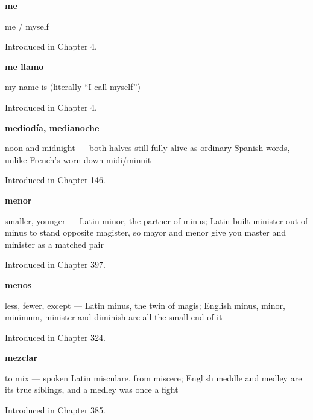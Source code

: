 \noindent\begin{minipage}[t]{\linewidth}
\raggedright
\textbf{me}\par
\small me / myself\par
\footnotesize Introduced in Chapter 4.
\end{minipage}\par\medskip

\noindent\begin{minipage}[t]{\linewidth}
\raggedright
\textbf{me llamo}\par
\small my name is (literally \textquotedblleft{}I call myself\textquotedblright{})\par
\footnotesize Introduced in Chapter 4.
\end{minipage}\par\medskip

\noindent\begin{minipage}[t]{\linewidth}
\raggedright
\textbf{mediodía, medianoche}\par
\small noon and midnight — both halves still fully alive as ordinary Spanish words, unlike French's worn-down midi/minuit\par
\footnotesize Introduced in Chapter 146.
\end{minipage}\par\medskip

\noindent\begin{minipage}[t]{\linewidth}
\raggedright
\textbf{menor}\par
\small smaller, younger — Latin minor, the partner of minus; Latin built minister out of minus to stand opposite magister, so mayor and menor give you master and minister as a matched pair\par
\footnotesize Introduced in Chapter 397.
\end{minipage}\par\medskip

\noindent\begin{minipage}[t]{\linewidth}
\raggedright
\textbf{menos}\par
\small less, fewer, except — Latin minus, the twin of magis; English minus, minor, minimum, minister and diminish are all the small end of it\par
\footnotesize Introduced in Chapter 324.
\end{minipage}\par\medskip

\noindent\begin{minipage}[t]{\linewidth}
\raggedright
\textbf{mezclar}\par
\small to mix — spoken Latin misculare, from miscere; English meddle and medley are its true siblings, and a medley was once a fight\par
\footnotesize Introduced in Chapter 385.
\end{minipage}\par\medskip

